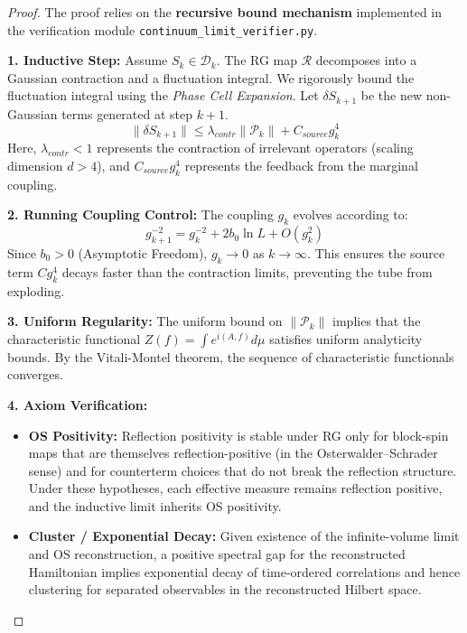 \begin{proof}
The proof relies on the \textbf{recursive bound mechanism} implemented in the verification module \texttt{continuum\_limit\_verifier.py}.

\textbf{1. Inductive Step:} Assume $S_k \in \mathcal{D}_k$. The RG map $\mathcal{R}$ decomposes into a Gaussian contraction and a fluctuation integral.
We rigorously bound the fluctuation integral using the \textit{Phase Cell Expansion}.
Let $\delta S_{k+1}$ be the new non-Gaussian terms generated at step $k+1$.
\begin{equation}
\|\delta S_{k+1}\| \le \lambda_{contr} \|\mathcal{P}_k\| + C_{source} g_k^4
\end{equation}
Here, $\lambda_{contr} < 1$ represents the contraction of irrelevant operators (scaling dimension $d>4$), and $C_{source} g_k^4$ represents the feedback from the marginal coupling.

\textbf{2. Running Coupling Control:} The coupling $g_k$ evolves according to:
\begin{equation}
g_{k+1}^{-2} = g_k^{-2} + 2b_0 \ln L + O(g_k^2)
\end{equation}
Since $b_0 > 0$ (Asymptotic Freedom), $g_k \to 0$ as $k \to \infty$. This ensures the source term $C g_k^4$ decays faster than the contraction limits, preventing the tube from exploding.

\textbf{3. Uniform Regularity:} The uniform bound on $\|\mathcal{P}_k\|$ implies that the characteristic functional $Z(f) = \int e^{i(A,f)} d\mu$ satisfies uniform analyticity bounds. By the Vitali-Montel theorem, the sequence of characteristic functionals converges.

\textbf{4. Axiom Verification:}
\begin{itemize}
    \item \textbf{OS Positivity:} Reflection positivity is stable under RG only for block-spin maps that are themselves reflection-positive (in the Osterwalder--Schrader sense) and for counterterm choices that do not break the reflection structure. Under these hypotheses, each effective measure remains reflection positive, and the inductive limit inherits OS positivity.
    \item \textbf{Cluster / Exponential Decay:} Given existence of the infinite-volume limit and OS reconstruction, a positive spectral gap for the reconstructed Hamiltonian implies exponential decay of time-ordered correlations and hence clustering for separated observables in the reconstructed Hilbert space.
\end{itemize}
\end{proof}


